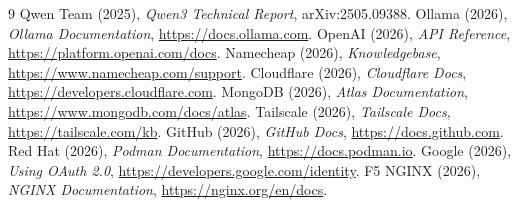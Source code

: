 \documentclass[
a4paper,
fontsize=13pt,
DIV=calc,
oneside,
numbers=enddot,
captions=tableheading,
bibliography=totoc,
]{scrreprt}
\begin{document}
	\begin{thebibliography}{9}
		\setlength{\itemsep}{0pt}
		\small
		 Qwen Team (2025), \emph{Qwen3 Technical Report}, arXiv:2505.09388.
		 Ollama (2026), \emph{Ollama Documentation}, \url{https://docs.ollama.com}.
		 OpenAI (2026), \emph{API Reference}, \url{https://platform.openai.com/docs}.
		 Namecheap (2026), \emph{Knowledgebase}, \url{https://www.namecheap.com/support}.
		 Cloudflare (2026), \emph{Cloudflare Docs}, \url{https://developers.cloudflare.com}.
		 MongoDB (2026), \emph{Atlas Documentation}, \url{https://www.mongodb.com/docs/atlas}.
		 Tailscale (2026), \emph{Tailscale Docs}, \url{https://tailscale.com/kb}.
		 GitHub (2026), \emph{GitHub Docs}, \url{https://docs.github.com}.
		 Red Hat (2026), \emph{Podman Documentation}, \url{https://docs.podman.io}.
		 Google (2026), \emph{Using OAuth 2.0}, \url{https://developers.google.com/identity}.
		 F5 NGINX (2026), \emph{NGINX Documentation}, \url{https://nginx.org/en/docs}.
	\end{thebibliography}
	
\end{document}
